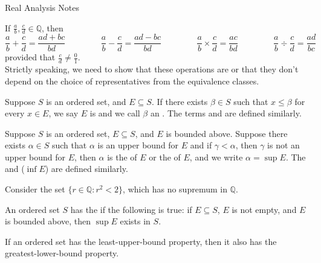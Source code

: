 \documentclass[11pt,letterpaper]{jacky}
\newcommand{\Qq}{\mathbb{Q}}
\begin{document}
\begin{center}
    \vspace*{20pt}
    \LARGE{Real Analysis Notes}
\end{center}

If $\frac{a}{b},\frac{c}{d}\in\Qq$, then
$$\frac{a}{b}+\frac{c}{d}=\frac{ad+bc}{bd} \hspace{50pt}
\frac{a}{b}-\frac{c}{d}=\frac{ad-bc}{bd} \hspace{50pt}
\frac{a}{b}\times\frac{c}{d}=\frac{ac}{bd} \hspace{50pt}
\frac{a}{b}\div\frac{c}{d}=\frac{ad}{bc}$$
provided that $\frac{c}{d}\neq\frac{0}{1}$.\\

Strictly speaking, we need to show that these operations are
 or that they don't depend on the choice of
representatives from the equivalence classes.

\begin{defi}
    Suppose $S$ is an ordered set, and $E\subseteq S$. If there exists
    $\beta\in S$ such that $x\leq \beta$ for every $x\in E$, we say $E$ is
     and we call $\beta$ an . The
    terms  and  are defined
    similarly.
\end{defi}

\begin{defi}
        Suppose $S$ is an ordered set, $E\subseteq S$, and $E$ is bounded
        above. Suppose there exists $\alpha\in S$ such that $\alpha$ is an
        upper bound for $E$ and if $\gamma<\alpha$, then $\gamma$ is not an
        upper bound for $E$, then $\alpha$ is the  of
        $E$ or the  of $E$, and we write $\alpha=\sup{E}$. The
         and  ($\inf{E}$) are
        defined similarly.
\end{defi}

\begin{ex}
    Consider the set $\{r\in\Qq:r^2<2\}$, which has no supremum in $\Qq$.
\end{ex}

\begin{defi}
  An ordered set $S$ has the  if the
  following is true: if $E\subseteq S$, $E$ is not empty, and $E$ is bounded
  above, then $\sup{E}$ exists in $S$.
\end{defi}

If an ordered set has the least-upper-bound property, then it also has the
greatest-lower-bound property.
\end{document}
